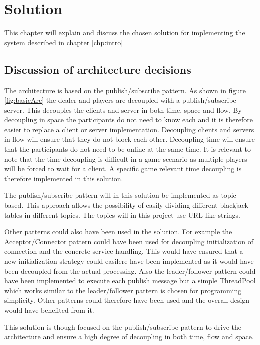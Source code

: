 \chapter{Solution}
This chapter will explain and discuss the chosen solution for implementing the system described in chapter \ref{chp:intro}

\section{Discussion of architecture decisions}
The architecture is based on the publish/subscribe pattern. As shown in figure \ref{fig:basicArc} the dealer and players are decoupled with a publish/subscribe server. This decouples the clients and server in both time, space and flow. By decoupling in space the participants do not need to know each and it is therefore easier to replace a client or server implementation. Decoupling clients and servers in flow will ensure that they do not block each other. Decoupling time will ensure that the participants do not need to be online at the same time. It is relevant to note that the time decoupling is difficult in a game scenario as multiple players will be forced to wait for a client. A specific game relevant time decoupling is therefore implemented in this solution.


The publish/subscribe pattern will in this solution be implemented as topic-based. This approach allows the possibility of easily dividing different blackjack tables in different topics. The topics will in this project use URL like strings.

Other patterns could also have been used in the solution. For example the Acceptor/Connector pattern could have been used for decoupling initialization of connection and the concrete service handling. This would have ensured that a new initialization strategy could easilere have been implemented as it would have been decoupled from the actual processing. Also the leader/follower pattern could have been implemented to execute each publish message but a simple ThreadPool which works similar to the leader/follower pattern is chosen for programming simplicity. Other patterns could therefore have been used and the overall design would have benefited from it.

This solution is though focused on the publish/subscribe pattern to drive the architecture and ensure a high degree of decoupling in both time, flow and space. 


